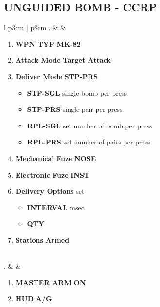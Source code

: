 \documentclass[8pt,usenames,dvipsnames,twoside]{article}
\begin{document}
		\subsection{UNGUIDED BOMB - CCRP}
		\begin{center}
			\begin{tabular}{l p{3cm} | p{8cm}}
				. &  & 
				\begin{minipage}[t]{\linewidth}
					\vspace{-7pt}
					\begin{enumerate}[label=(\alph*)]
						\item \textbf{WPN TYP} \dotfill \textbf{MK-82}
						\item \textbf{Attack Mode} \dotfill \textbf{Target Attack}
						\item \textbf{Deliver Mode} \dotfill \textbf{STP-PRS}
						\begin{itemize}
							\item \textbf{STP-SGL} single bomb per press
							\item \textbf{STP-PRS} single pair per press
							\item \textbf{RPL-SGL} set number of bomb per press
							\item \textbf{RPL-PRS} set number of pairs per press
						\end{itemize}
						\item \textbf{Mechanical Fuze} \dotfill \textbf{NOSE}
						\item \textbf{Electronic Fuze} \dotfill \textbf{INST}
						\item \textbf{Delivery Options} \dotfill set 
						\begin{itemize}
							\item \textbf{INTERVAL}  msec
							\item \textbf{QTY} 
						\end{itemize}
						\item \textbf{Stations} \dotfill \textbf{Armed}
					\end{enumerate}
				\end{minipage} \\
				. &  & 
				\begin{minipage}[t]{\linewidth}
					\vspace{-7pt}
					\begin{enumerate}[label=(\alph*)]
						\item \textbf{MASTER ARM} \dotfill \textbf{ON}
						\item \textbf{HUD} \dotfill \textbf{A/G}

\end{enumerate}
\end{minipage}
\end{tabular}
\end{center}
\end{document}
